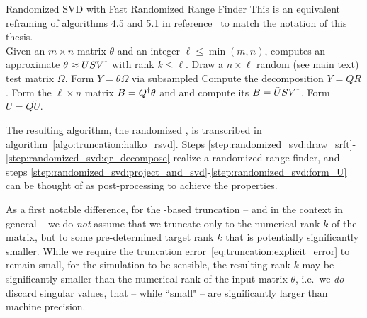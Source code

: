 \begin{Algorithm}{Randomized SVD with Fast Randomized Range Finder}{
    \label{algo:truncation:halko_rsvd}
    This is an equivalent reframing of algorithms 4.5 and 5.1 in reference~\cite{halko2010} to match the notation of this thesis.
    \\[1ex]
    Given an $m \times n$ matrix $\theta$ and an integer $\ell \leq \min(m, n)$, computes an approximate  $\theta \approx U S V^\dagger$ with rank $k \leq \ell$.
    \label{algo:randomized_svd}
}
    \step\label{step:randomized_svd:draw_srft}
    Draw a $n \times \ell$ random  (see main text) test matrix $\Omega$.
    \step\label{step:randomized_svd:apply_Omega}
    Form $Y = \theta \Omega$ via subsampled 
    \step\label{step:randomized_svd:qr_decompose}
    Compute the  decomposition $Y = QR$.
    \step\label{step:randomized_svd:project_and_svd}
    Form the $\ell \times n$ matrix $B = Q^\dagger\theta$ and and compute its  $B = \tilde U S V^\dagger$.
    \step\label{step:randomized_svd:form_U} Form $U = Q \tilde U$.
\end{Algorithm}

The resulting algorithm, the randomized , is transcribed in algorithm~\ref{algo:truncation:halko_rsvd}.
%
Steps \ref{step:randomized_svd:draw_srft}-\ref{step:randomized_svd:qr_decompose} realize a randomized range finder, and steps \ref{step:randomized_svd:project_and_svd}-\ref{step:randomized_svd:form_U} can be thought of as post-processing to achieve the  properties.

As a first notable difference, for the -based truncation -- and in the  context in general -- we do \emph{not} assume that we truncate only to the numerical rank $k$ of the matrix, but to some pre-determined target rank $k$ that is potentially significantly smaller.
%
While we require the truncation error~\eqref{eq:truncation:explicit_error} to remain small, for the simulation to be sensible, the resulting rank $k$ may be significantly smaller than the numerical rank of the input matrix $\theta$, i.e.~we \emph{do} discard singular values, that -- while ``small" -- are significantly larger than machine precision.



